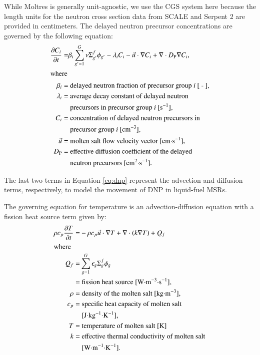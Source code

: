 While Moltres is generally unit-agnostic, we use the CGS system here because
the length units for the neutron cross section data from SCALE and Serpent 2
are provided in centimeters. The delayed neutron precursor concentrations are
governed by the following equation:
%
\begin{align}
    \frac{\partial C_i}{\partial t} =& \beta_i \sum^G_{g'=1} \nu \Sigma^f_{g'}
    \phi_{g'} - \lambda_i C_i - \vec{u} \cdot \nabla C_i + \nabla \cdot
    D_{\text{P}} \nabla C_i, \label{eq:dnp} \\
    \intertext{where}
    \beta_i =& \text{ delayed neutron fraction of precursor group $i$ [ - ],}
    \nonumber \\
    \lambda_i =& \text{ average decay constant of delayed neutron} \nonumber \\
    &\text{ precursors in precursor group $i$ [s$^{-1}$],} \nonumber \\
    C_i =& \text{ concentration of delayed neutron precursors in}
    \nonumber \\
    &\text{ precursor group $i$ [cm$^{-3}$],} \nonumber \\
    \vec{u} =& \text{ molten salt flow velocity vector [cm$\cdot$s$^{-1}$],}
    \nonumber \\
    D_{\text{P}} =& \text{ effective diffusion coefficient of the delayed}
    \nonumber \\
    &\text{ neutron precursors [cm$^2\cdot$s$^{-1}$].} \nonumber
\end{align}

The last two terms in Equation \ref{eq:dnp} represent the advection and
diffusion terms, respectively, to model the movement of \gls{DNP} in
liquid-fuel \glspl{MSR}.

The governing equation for temperature is an advection-diffusion equation with
a fission heat source term given by:
%
\begin{align}
    \rho c_{p} \frac{\partial T}{\partial t} =& - \rho c_p \vec{u}
    \cdot \nabla T + \nabla \cdot \left(k \nabla T \right) + Q_f
    \label{eq:temp} \\
    \intertext{where}
    Q_f =& \sum^G_{g=1} \epsilon_g \Sigma_g^f \phi_g \nonumber \\
    =& \text{ fission heat source [W$\cdot$m$^{-3}\cdot$s$^{-1}$],} \nonumber
    \\
    \rho =& \text{ density of the molten salt [kg$\cdot$m$^{-3}$],}
    \nonumber \\
    c_p =& \text{ specific heat capacity of molten salt} \nonumber \\
    &\text{ [J$\cdot$kg$^{-1}\cdot$K$^{-1}$],} \nonumber \\
    T =& \text{ temperature of molten salt [K]} \nonumber \\
    k =& \text{ effective thermal conductivity of molten salt} \nonumber \\
    &\text{ [W$\cdot$m$^{-1}\cdot$K$^{-1}$].} \nonumber
\end{align}

